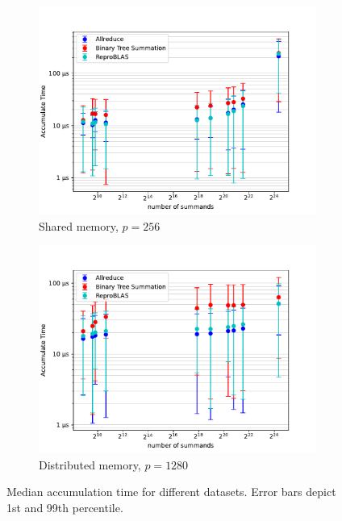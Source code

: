\begin{figure}
\begin{subfigure}{1.0\textwidth}
\centering
\includegraphics[scale=0.75]{figures/benchmarkScatter.pdf}
\caption{Shared memory, $p=256$}
\label{fig:benchmarkOverview256}
\end{subfigure}

\begin{subfigure}{1.0\textwidth}
\centering
\includegraphics[scale=0.75]{figures/benchmarkScatter1280.pdf}
\caption{Distributed memory, $p=1280$}
\label{fig:benchmarkOverview1280}
\end{subfigure}

\caption{Median accumulation time for different datasets. Error bars depict 1st and 99th percentile.}
\label{fig:benchmarkOverview}
\end{figure}

